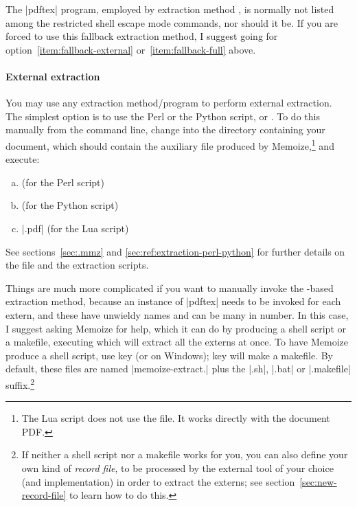 \documentclass[a4paper,11pt]{article}
\begin{document}
The |pdftex| program, employed by extraction method , is
normally not listed among the restricted shell escape mode commands, nor should
it be.  If you are forced to use this fallback extraction method, I suggest
going for option~\ref{item:fallback-external} or~\ref{item:fallback-full}
above.

\paragraph{External extraction}
  
You may use any extraction method\slash program to perform external extraction.
The simplest option is to use the Perl or the Python script,
 or .  To do this
manually from the command line, change into the directory containing your
document, which should contain the auxiliary \dmmz file produced by
Memoize,\footnote{The Lua script does not use the \dmmz file. It works directly
  with the document PDF.}  and execute:
  
\begin{enumerate}[(a)]
\item {} \dmmz \hfill (for
  the Perl script)
\item {} \dmmz \hfill (for
  the Python script)
\item {} |.pdf| \hfill (for
  the Lua script)
\end{enumerate}

See sections~\ref{sec:.mmz} and \ref{sec:ref:extraction-perl-python} for
further details on the \dmmz file and the extraction scripts.

Things are much more complicated if you want to manually invoke the
-based extraction method, because an instance of |pdftex| needs to
be invoked for each extern, and these have unwieldy names and can be many in
number.  In this case, I suggest asking Memoize for help, which it can do by
producing a shell script or a makefile, executing which will extract all the
externs at once. To have Memoize produce a shell script, use key
 (or
 on Windows); key
 will make a makefile.  By
default, these files are named |memoize-extract.| plus the
|.sh|, |.bat| or |.makefile| suffix.\footnote{If neither a shell script nor a
  makefile works for you, you can also define your own kind of \emph{record
    file}, to be processed by the external tool of your choice (and
  implementation) in order to extract the externs; see
  section~\ref{sec:new-record-file} to learn how to do this.}
\end{document}
